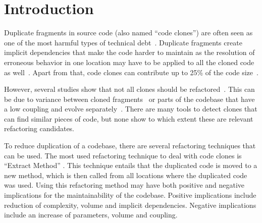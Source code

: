 \documentclass[sigconf,review,anonymous]{acmart}
\begin{document}
\begin{abstract}
\end{abstract}


\maketitle

\section{Introduction}
Duplicate fragments in source code (also named ``code clones'') are often seen as one of the most harmful types of technical debt~\cite{fowler2018refactoring}. Duplicate fragments create implicit dependencies that make the code harder to maintain as the resolution of erroneous behavior in one location may have to be applied to all the cloned code as well~\cite{ostberg2014automatically, chatterji2013effects}. Apart from that, code clones can contribute up to 25\% of the code size~\cite{bruntink2005use}.

However, several studies show that not all clones should be refactored~\cite{jarzabek2010clones, kapser2008cloning}. This can be due to variance between cloned fragments~\cite{roy2007survey} or parts of the codebase that have a low coupling and evolve separately~\cite{jarzabek2010clones}. There are many tools to detect clones \cite{roy2007survey, sheneamer2016survey, svajlenko2014evaluating, gautam2016various} that can find similar pieces of code, but none show to which extent these are relevant refactoring candidates.

To reduce duplication of a codebase, there are several refactoring techniques that can be used. The most used refactoring technique to deal with code clones is ``Extract Method'' \cite{fowler2018refactoring}. This technique entails that the duplicated code is moved to a new method, which is then called from all locations where the duplicated code was used. Using this refactoring method may have both positive and negative implications for the maintainability of the codebase. Positive implications include reduction of complexity, volume and implicit dependencies. Negative implications include an increase of parameters, volume and coupling. 
\end{document}

